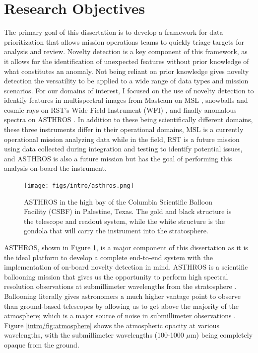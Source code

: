 \section{Research Objectives}
The primary goal of this dissertation is to develop a framework for data prioritization that allows mission operations teams to quickly triage targets for analysis and review.
Novelty detection is a key component of this framework, as it allows for the identification of unexpected features without prior knowledge of what constitutes an anomaly.
Not being reliant on prior knowledge gives novelty detection the versatility to be applied to a wide range of data types and mission scenarios.
For our domains of interest, I focused on the use of novelty detection to identify features in multispectral images from Mastcam on MSL \parencite{horton2021integrating}, snowballs and cosmic rays on RST's Wide Field Instrument (WFI) \parencite{horton2024anomaly}, and finally anomalous spectra on ASTHROS \parencite{horton2024board}.
In addition to these being scientifically different domains, these three instruments differ in their operational domains, MSL is a currently operational mission analyzing data while in the field, RST is a future mission using data collected during integration and testing to identify potential issues, and ASTHROS is also a future mission but has the goal of performing this analysis on-board the instrument.

\begin{figure}
\centering
\texttt{[image: figs/intro/asthros.png]}
\caption[The Astrophysics Stratospheric Telescope for High Spectral Resolution Observations at Submillimeter-wavelengths (ASTHROS)]{
    ASTHROS in the high bay of the Columbia Scientific Balloon Facility (CSBF) in Palestine, Texas. 
    The gold and black structure is the telescope and readout system, while the white structure is the gondola that will carry the instrument into the stratosphere. 
}
\label{intro/fig:asthros}
\end{figure}

ASTHROS, shown in Figure \ref{intro/fig:asthros}, is a major component of this dissertation as it is the ideal platform to develop a complete end-to-end system with the implementation of on-board novelty detection in mind. 
ASTHROS is a scientific ballooning mission that gives us the opportunity to perform high spectral resolution observations at submillimeter wavelengths from the stratosphere \parencite{siles2020asthros}.
Ballooning literally gives astronomers a much higher vantage point to observe than ground-based telescopes by allowing us to get above the majority of the atmosphere; which is a major source of noise in submillimeter observations \parencite{yajima2009scientific}.
Figure \ref{intro/fig:atmosphere} shows the atmospheric opacity at various wavelengths, with the submillimeter wavelengths (100-1000 $\mu$m) being completely opaque from the ground.

